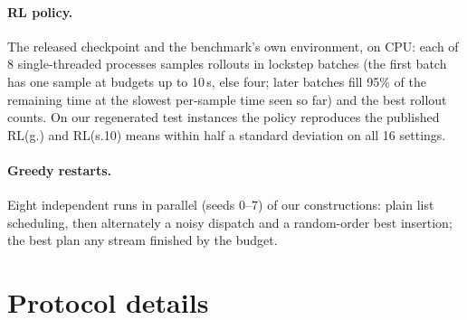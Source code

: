 \documentclass[10pt]{article}
\begin{document}
\paragraph{RL policy.} The released checkpoint and the benchmark's own environment, on CPU: each of 8 single-threaded
processes samples rollouts in lockstep batches (the first batch has one sample at budgets up to 10\,s, else four;
later batches fill 95\% of the remaining time at the slowest per-sample time seen so far) and the best rollout counts.
On our regenerated test instances the policy reproduces the published RL(g.) and RL(s.10) means within half a
standard deviation on all 16 settings.

\paragraph{Greedy restarts.} Eight independent runs in parallel (seeds 0--7) of our constructions: plain list scheduling, then
alternately a noisy dispatch and a random-order best insertion; the best plan any stream finished by the budget.



\section{Protocol details}
\label{sec:s-protocol}
\end{document}
